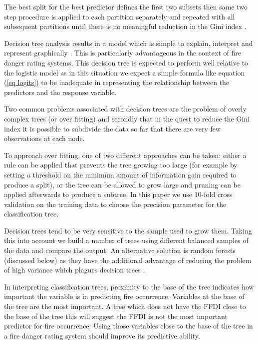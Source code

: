 \documentclass[11pt,a4paper]{article}
\begin{document}
The best split for the best predictor defines the first two subsets then same two step procedure is applied to each partition separately and repeated with all subsequent partitions until there is no meaningful reduction in the Gini index \citep{berk08,james13}.

Decision tree analysis results in a model which is simple to explain, interpret and represent graphically \citep{james13}. This is particularly advantageous in the context of fire danger rating systems.
This decision tree is expected to perform well relative to the logistic model as in this situation we expect a simple formula like equation (\ref{eq logits}) to be inadequate in representing the relationship between the predictors and the response variable.

Two common problems associated with decision trees are the problem of overly complex trees (or over fitting) and secondly that in the quest to reduce the Gini index it is possible to subdivide the data so far that there are very few observations at each node.

To approach over fitting, one of two different approaches can be taken: either a rule can be applied that prevents the tree growing too large (for example by setting a threshold on the minimum amount of information gain required to produce a split), or the tree can be allowed to grow large and pruning can be applied afterwards to produce a subtree. In this paper we use 10-fold cross validation on the training data to choose the precision parameter for the classification tree.

Decision trees tend to be very sensitive to the sample used to grow them. Taking this into account we build a number of trees using different balanced samples of the data and compare the output. An alternative solution is random forests (discussed below) as they have the additional advantage of reducing the problem of high variance which plagues decision trees \citep{james13}.

In interpreting classification trees, proximity to the base of the tree indicates how important the variable is in predicting fire occurrence. Variables at the base of the tree are the most important. A tree which does not have the FFDI close to the base of the tree this will suggest the FFDI is not the most important predictor for fire occurrence. Using those variables close to the base of the tree in a fire danger rating system should improve its predictive ability.
\end{document}
